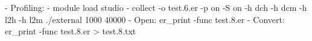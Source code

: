 - Profiling:
    - module load studio
    - collect -o test.6.er -p on -S on -h dch -h dcm -h l2h -h l2m ./external 1000 40000 
    - Open: er_print -func test.8.er
    - Convert: er_print -func test.8.er > test.8.txt